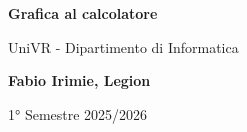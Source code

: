 \begin{titlepage}
	\begin{center}
		\vspace*{1cm}

		\Huge
		\textbf{Grafica al calcolatore}

		\vspace{0.5cm}
		\LARGE
		UniVR - Dipartimento di Informatica

		\vspace{1.5cm}

		\textbf{Fabio Irimie, Legion}

		\vfill


		\vspace{0.8cm}


		1° Semestre 2025/2026

	\end{center}
\end{titlepage}
